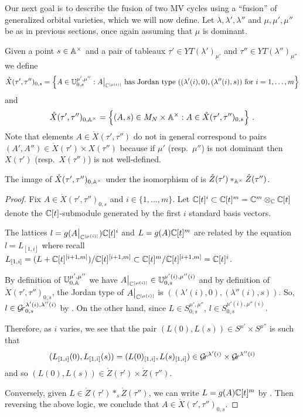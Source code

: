 \documentclass{article}
\begin{document}
% 
Our next goal is to describe the fusion of two MV cycles using a ``fusion'' of generalized orbital varieties, which we will now define. 
Let $\lambda,\lambda',\lambda''$ and $\mu, \mu',\mu''$ be as in previous sections, once again assuming that $\mu$ is dominant.
% 

Given a point $s\in\Ax$ and a pair of tableaux $\tau'\in YT(\lambda')_{\mu'}$ and $\tau''\in YT(\lambda'')_{\mu''}$ we define
% 
\begin{equation*}
    \mathring X(\tau',\tau'')_{0,s} = \left\{A\in\UU_{0,s}^{\mu',\mu''} : A \big|_{\CC^{|\mu(i)|}} 
    \text{ has Jordan type } ((\lambda'(i), 0), (\lambda''(i), s)) \text{ for } i=1,\dots,m\right\}
\end{equation*}
% 
and
\begin{equation*}
    \mathring X(\tau',\tau'')_{0,\AA^\times} = 
    \left\{
        (A,s)\in M_N \times \AA^\times: 
        A \in \mathring X(\tau',\tau'')_{0,s} 
    \right\}\,.
\end{equation*}
% 
Note that elements $A\in\mathring X(\tau',\tau'')$ do not in general correspond to pairs $(A',A'')\in\mathring X(\tau')\times X(\tau'')$ because if $\mu'$ (resp.\ $\mu''$) is not dominant then $X(\tau')$ (resp.\ $X(\tau'')$) is not well-defined. 
% 
\begin{proposition}
\label{pr:XttZtt}
    The image of $\mathring X(\tau',\tau'')_{0,\AA^\times}$ under the isomorphism of  is $\mathring Z(\tau')\ast_{\AA^\times} \mathring Z(\tau'')$. 
\end{proposition}
% 

\begin{proof}
% 
Fix $A\in \mathring X(\tau',\tau'')_{0,s} $ and $i \in \{1,\dots, m\}$. 
% 
Let $\CC[t]^i\subset\CC[t]^m = \CC^m\otimes_\CC\CC[t]$ denote the $\CC[t]$-submodule generated by the first $i$ standard basis vectors.

The lattices $l=g(A\big|_{\CC^{|\mu(i)|}})\CC[t]^i$ and $L=g(A)\CC[t]^m$ are related by the equation $ l = L_{[1,i]}$ where recall $L_{[1,i]} = (L + \CC[t]^{[i+1,m]}) / \CC[t]^{[i+1,m]}\subset \CC[t]^m/\CC[t]^{[i+1,m]} = \CC[t]^i$. 
    
By definition of $\UU^{\mu',\mu''}_{0,\AA}$ we have $A\big|_{\CC^{|\mu(i)|}}\in\UU^{\mu'(i),\mu''(i)}_{0,s}$ and by definition of $\mathring X(\tau',\tau'')_{0,s}$, the Jordan type of $A\big|_{\CC^{|\mu(i)|}}$ is $((\lambda'(i),0),(\lambda''(i),s))$. So, $l \in\Gr_{0,s}^{\lambda'(i),\lambda''(i)}$ by . 
On the other hand, since $L\in S^{\mu',\mu''}_{0,s}$, $l\in S^{\mu'(i),\mu''(i)}_{0,s}$. 

Therefore, as $i$ varies, we see that the pair $(L(0),L(s))\in S^{\mu'}\times S^{\mu''}$ is such that 
$$
    (L_{[1,i]}(0),L_{[1,i]}(s))  = (L(0)_{[1,i]},L(s)_{[1,i]}) \in \Gr^{\lambda'(i)}\times\Gr^{\lambda''(i)}
$$ 
and so $(L(0),L(s))\in \mathring Z(\tau')\times \mathring Z(\tau'')$. 

Conversely, given
$L\in\mathring Z(\tau')\ast_s \mathring Z(\tau'')$, we can write $ L = g(A)\CC[t]^m$ by  . Then reversing the above logic, we conclude that $ A \in \mathring X(\tau',\tau'')_{0,s}$.
\end{proof}
% 
\end{document}
